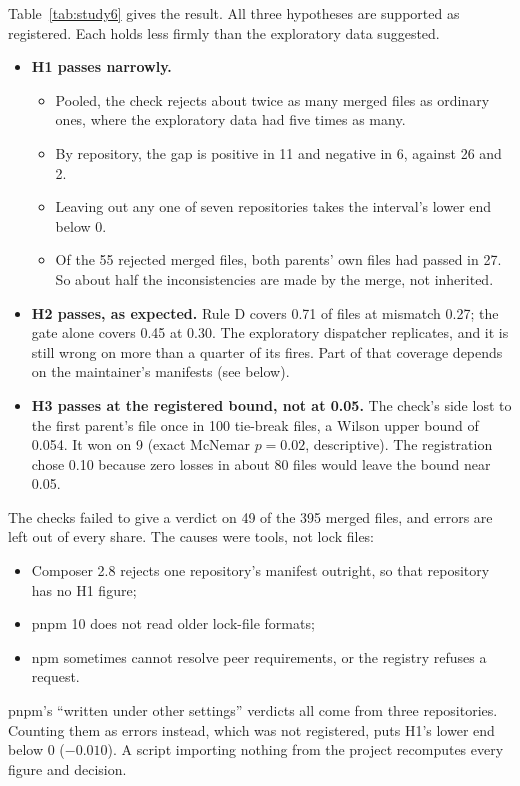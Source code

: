 \documentclass[11pt]{article}
\begin{document}
\begin{table}[t]
\centering
\caption{Study 6, as registered: 395 conflicted lock files from 366 merges in 25 repositories.
H1 and H2 are means over the repositories with the figure, with 95\% t-intervals. Below them,
descriptive figures pooled over files, with Wilson intervals.}
\label{tab:study6}
\resizebox{\linewidth}{!}{}
\end{table}

Table~\ref{tab:study6} gives the result. All three hypotheses are supported as registered. Each
holds less firmly than the exploratory data suggested.
\begin{itemize}
  \item \textbf{H1 passes narrowly.}
  \begin{itemize}
    \item Pooled, the check rejects about twice as many merged files as ordinary ones, where the
    exploratory data had five times as many.
    \item By repository, the gap is positive in 11 and negative in 6, against 26 and 2.
    \item Leaving out any one of seven repositories takes the interval's lower end below 0.
    \item Of the 55 rejected merged files, both parents' own files had passed in 27. So about
    half the inconsistencies are made by the merge, not inherited.
  \end{itemize}
  \item \textbf{H2 passes, as expected.} Rule D covers 0.71 of files at mismatch 0.27; the gate
  alone covers 0.45 at 0.30. The exploratory dispatcher replicates, and it is still wrong on more
  than a quarter of its fires. Part of that coverage depends on the maintainer's manifests (see
  below).
  \item \textbf{H3 passes at the registered bound, not at 0.05.} The check's side lost to the
  first parent's file once in 100 tie-break files, a Wilson upper bound of 0.054. It won on 9
  (exact McNemar $p=0.02$, descriptive). The registration chose 0.10 because zero losses in
  about 80 files would leave the bound near 0.05.
\end{itemize}
The checks failed to give a verdict on 49 of the 395 merged files, and errors are left out of
every share. The causes were tools, not lock files:
\begin{itemize}
  \item Composer 2.8 rejects one repository's manifest outright, so that repository has no H1
  figure;
  \item pnpm 10 does not read older lock-file formats;
  \item npm sometimes cannot resolve peer requirements, or the registry refuses a request.
\end{itemize}
pnpm's ``written under other settings'' verdicts all come from three repositories. Counting them
as errors instead, which was not registered, puts H1's lower end below 0 ($-0.010$). A script
importing nothing from the project recomputes every figure and decision.
\end{document}
